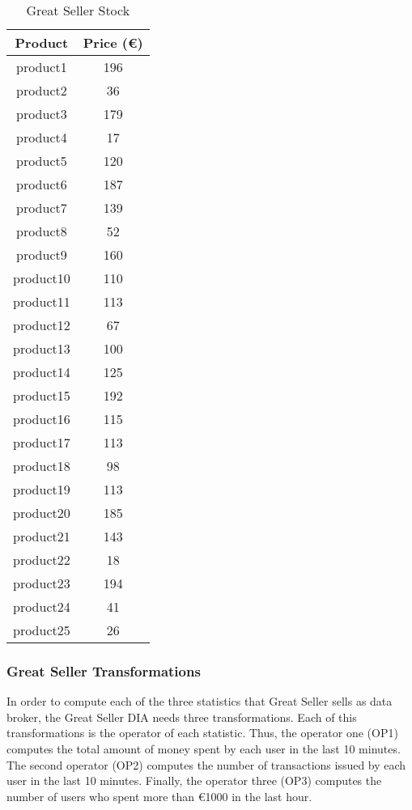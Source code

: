 \begin{table}[h!]
\centering
	\begin{tabular}{||c|c||} 
	\hline\hline
	Product & Price (\euro{}) \\ [1ex] 
	\hline\hline
	product1 & 196 \\ 
	\hline
	product2 & 36 \\ 
	\hline
	product3 & 179 \\ 
	\hline
	product4 & 17 \\ 
	\hline
	product5 & 120 \\ 
	\hline
	product6 & 187 \\ 
	\hline
	product7 & 139 \\ 
	\hline
	product8 & 52 \\ 
	\hline
	product9 & 160 \\ 
	\hline
	product10 & 110 \\ 
	\hline
	product11 & 113 \\ 
	\hline
	product12 & 67 \\ 
	\hline
	product13 & 100 \\ 
	\hline
	product14 & 125 \\ 
	\hline
	product15 & 192 \\ 
	\hline
	product16 & 115 \\ 
	\hline
	product17 & 113 \\ 
	\hline
	product18 & 98 \\ 
	\hline
	product19 & 113 \\ 
	\hline
	product20 & 185 \\ 
	\hline
	product21 & 143 \\ 
	\hline
	product22 & 18 \\ 
	\hline
	product23 & 194 \\ 
	\hline
	product24 & 41 \\ 
	\hline
	product25 & 26 \\ 
	\hline\hline
	\end{tabular}
\caption{Great Seller Stock}
\label{Great Seller Stock}
\end{table}

\subsubsection*{Great Seller Transformations}
In order to compute each of the three statistics that Great Seller sells as data broker, the Great Seller DIA needs three transformations. Each of this transformations is the operator of each statistic. Thus, the operator one (OP1) computes the total amount of money spent by each user in the last 10 minutes. The second operator (OP2) computes the number of transactions issued by each user in the last 10 minutes. Finally, the operator three (OP3) computes the number of users who spent more than \euro{1000} in the last hour.

